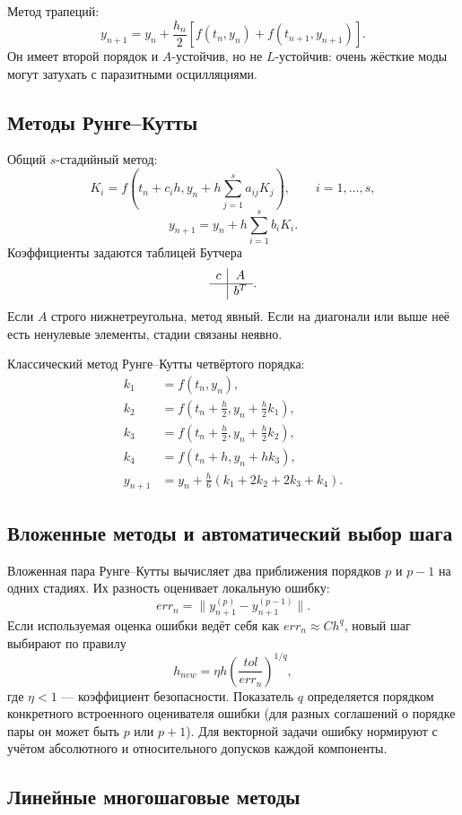 Метод трапеций:
\[
    y_{n+1}=y_n+\frac{h_n}{2}
    \left[f(t_n,y_n)+f(t_{n+1},y_{n+1})\right].
\]
Он имеет второй порядок и $A$-устойчив, но не $L$-устойчив: очень жёсткие моды
могут затухать с паразитными осцилляциями.

\subsection{Методы Рунге--Кутты}

Общий $s$-стадийный метод:
\[
    K_i=f\left(t_n+c_i h,
    y_n+h\sum_{j=1}^{s}a_{ij}K_j\right),
    \qquad i=1,\ldots,s,
\]
\[
    y_{n+1}=y_n+h\sum_{i=1}^{s}b_iK_i.
\]
Коэффициенты задаются таблицей Бутчера
\[
\begin{array}{c|c}
 c&A\\ \hline
 &b^T
\end{array}.
\]
Если $A$ строго нижнетреугольна, метод явный. Если на диагонали или выше неё есть
ненулевые элементы, стадии связаны неявно.

Классический метод Рунге--Кутты четвёртого порядка:
\[
\begin{aligned}
k_1&=f(t_n,y_n),\\
k_2&=f\left(t_n+\frac h2,y_n+\frac h2k_1\right),\\
k_3&=f\left(t_n+\frac h2,y_n+\frac h2k_2\right),\\
k_4&=f(t_n+h,y_n+hk_3),\\
y_{n+1}&=y_n+\frac h6(k_1+2k_2+2k_3+k_4).
\end{aligned}
\]

\subsection{Вложенные методы и автоматический выбор шага}

Вложенная пара Рунге--Кутты вычисляет два приближения порядков $p$ и $p-1$ на
одних стадиях. Их разность оценивает локальную ошибку:
\[
    err_n=\|y_{n+1}^{(p)}-y_{n+1}^{(p-1)}\|.
\]
Если используемая оценка ошибки ведёт себя как
$err_n\approx C h^q$, новый шаг выбирают по правилу
\[
    h_{new}=\eta h
    \left(\frac{tol}{err_n}\right)^{1/q},
\]
где $\eta<1$ --- коэффициент безопасности. Показатель $q$ определяется порядком
конкретного встроенного оценивателя ошибки (для разных соглашений о порядке пары
он может быть $p$ или $p+1$). Для векторной задачи ошибку нормируют с учётом
абсолютного и относительного допусков каждой компоненты.

\subsection{Линейные многошаговые методы}

